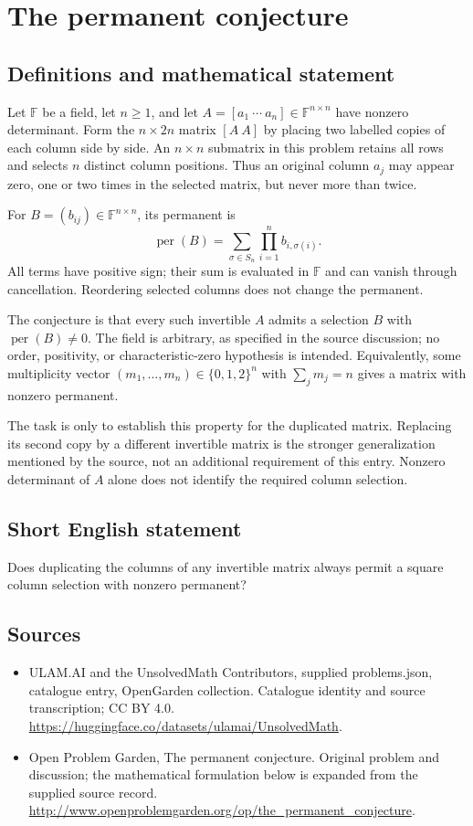 \documentclass[11pt,a4paper]{article}
\begin{document}
\section*{The permanent conjecture}\label{statement}

\subsection{Definitions and mathematical statement}
Let $\mathbb F$ be a field, let $n\ge1$, and let
$A=[a_1\ \cdots\ a_n]\in\mathbb F^{n\times n}$ have nonzero determinant.
Form the $n\times2n$ matrix $[A\ A]$ by placing two labelled copies of
each column side by side. An $n\times n$ submatrix in this problem retains
all rows and selects $n$ distinct column positions. Thus an original
column $a_j$ may appear zero, one or two times in the selected matrix,
but never more than twice.

For $B=(b_{ij})\in\mathbb F^{n\times n}$, its permanent is
\[
 \operatorname{per}(B)=\sum_{\sigma\in S_n}
                         \prod_{i=1}^n b_{i,\sigma(i)}.
\]
All terms have positive sign; their sum is evaluated in $\mathbb F$ and
can vanish through cancellation. Reordering selected columns does not
change the permanent.

The conjecture is that every such invertible $A$ admits a selection $B$
with $\operatorname{per}(B)\ne0$. The field is arbitrary, as specified
in the source discussion; no order, positivity, or characteristic-zero
hypothesis is intended. Equivalently, some multiplicity vector
$(m_1,\ldots,m_n)\in\{0,1,2\}^n$ with $\sum_jm_j=n$ gives a matrix
with nonzero permanent.

The task is only to establish this property for the duplicated matrix.
Replacing its second copy by a different invertible matrix is the
stronger generalization mentioned by the source, not an additional
requirement of this entry. Nonzero determinant of $A$ alone does not
identify the required column selection.
\subsection{Short English statement}
Does duplicating the columns of any invertible matrix always permit a square column selection with nonzero permanent?
\subsection{Sources}
\begin{itemize}
\item[S1] ULAM.AI and the UnsolvedMath Contributors, supplied problems.json, catalogue entry, OpenGarden collection. Catalogue identity and source transcription; CC BY 4.0.
\url{https://huggingface.co/datasets/ulamai/UnsolvedMath}.
\item[S2] Open Problem Garden, The permanent conjecture. Original problem and discussion; the mathematical formulation below is expanded from the supplied source record.
\url{http://www.openproblemgarden.org/op/the_permanent_conjecture}.
\end{itemize}
\end{document}
